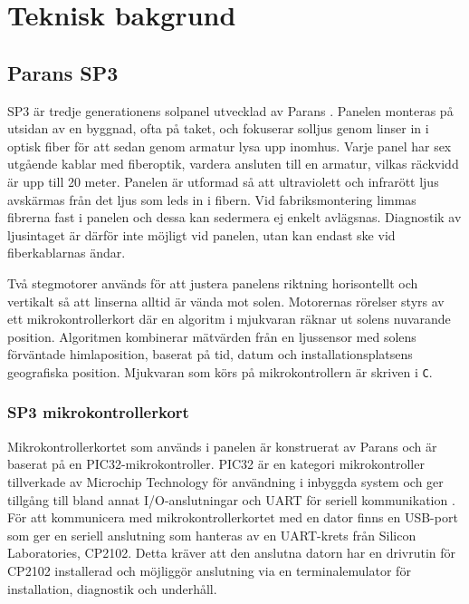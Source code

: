 \section{Teknisk bakgrund} %
\label{sec:teknisk_bakgrund}
    \subsection{Parans SP3} %
    \label{sub:parans_sp3}
        SP3 är tredje generationens solpanel utvecklad av Parans \cite{parans_manual}. Panelen monteras på utsidan av en byggnad, ofta på taket, och fokuserar solljus genom linser in i optisk fiber för att sedan genom armatur lysa upp inomhus. Varje panel har sex utgående kablar med fiberoptik, vardera ansluten till en armatur, vilkas räckvidd är upp till 20 meter. Panelen är utformad så att ultraviolett och infrarött ljus avskärmas från det ljus som leds in i fibern. Vid fabriksmontering limmas fibrerna fast i panelen och dessa kan sedermera ej enkelt avlägsnas. Diagnostik av ljusintaget är därför inte möjligt vid panelen, utan kan endast ske vid fiberkablarnas ändar.\bigskip

        Två stegmotorer används för att justera panelens riktning horisontellt och vertikalt så att linserna alltid är vända mot solen. Motorernas rörelser styrs av ett mikrokontrollerkort där en algoritm i mjukvaran räknar ut solens nuvarande position. Algoritmen kombinerar mätvärden från en ljussensor med solens förväntade himlaposition, baserat på tid, datum och installationsplatsens geografiska position. Mjukvaran som körs på mikrokontrollern är skriven i \texttt{C}.

        \subsubsection{SP3 mikrokontrollerkort} %
        \label{ssub:sp3_mikrokontrollerkort}
            Mikrokontrollerkortet som används i panelen är konstruerat av Parans och är baserat på en PIC32-mikrokontroller. PIC32 är en kategori mikrokontroller tillverkade av Microchip Technology för användning i inbyggda system och ger tillgång till bland annat I/O-anslutningar och UART för seriell kommunikation \cite{PIC32}. För att kommunicera med mikrokontrollerkortet med en dator finns en USB-port som ger en seriell anslutning som hanteras av en UART-krets från Silicon Laboratories, CP2102. Detta kräver att den anslutna datorn har en drivrutin för CP2102 installerad och möjliggör anslutning via en terminalemulator för installation, diagnostik och underhåll.

